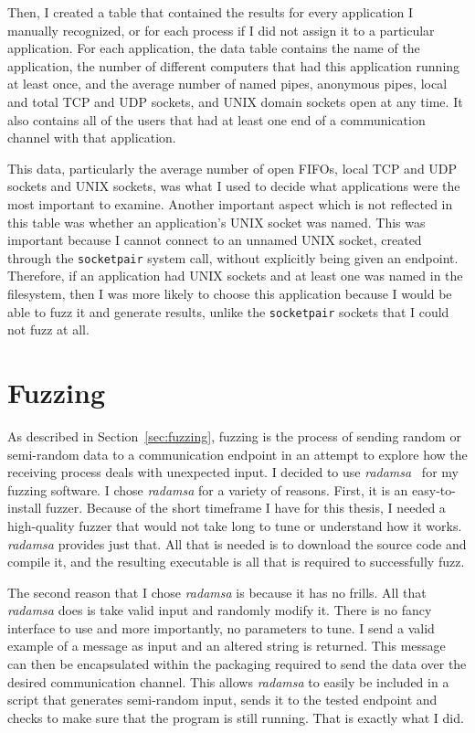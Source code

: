Then, I created a table that contained the results for every application I manually recognized, or for each process if I did not assign it to a particular application.  For each application, the data table contains the name of the application, the number of different computers that had this application running at least once, and the average number of named pipes, anonymous pipes, local and total TCP and UDP sockets, and UNIX domain sockets open at any time.  It also contains all of the users that had at least one end of a communication channel with that application.

This data, particularly the average number of open FIFOs, local TCP and UDP sockets and UNIX sockets, was what I used to decide what applications were the most important to examine.  Another important aspect which is not reflected in this table was whether an application's UNIX socket was named.  This was important because I cannot connect to an unnamed UNIX socket, created through the \texttt{socketpair} system call, without explicitly being given an endpoint.  Therefore, if an application had UNIX sockets and at least one was named in the filesystem, then I was more likely to choose this application because I would be able to fuzz it and generate results, unlike the \texttt{socketpair} sockets that I could not fuzz at all.

\section{Fuzzing}
\label{sec:fuzzingMethods}
As described in Section~\ref{sec:fuzzing}, fuzzing is the process of sending random or semi-random data to a communication endpoint in an attempt to explore how the receiving process deals with unexpected input.  I decided to use \textit{radamsa}~\cite{radamsa} for my fuzzing software.  I chose \textit{radamsa} for a variety of reasons.  First, it is an easy-to-install fuzzer.  Because of the short timeframe I have for this thesis, I needed a high-quality fuzzer that would not take long to tune or understand how it works.  \textit{radamsa} provides just that.  All that is needed is to download the source code and compile it, and the resulting executable is all that is required to successfully fuzz.

The second reason that I chose \textit{radamsa} is because it has no frills.  All that \textit{radamsa} does is take valid input and randomly modify it.  There is no fancy interface to use and more importantly, no parameters to tune.  I send a valid example of a message as input and an altered string is returned.  This message can then be encapsulated within the packaging required to send the data over the desired communication channel.  This allows \textit{radamsa} to easily be included in a script that generates semi-random input, sends it to the tested endpoint and checks to make sure that the program is still running.  That is exactly what I did.


